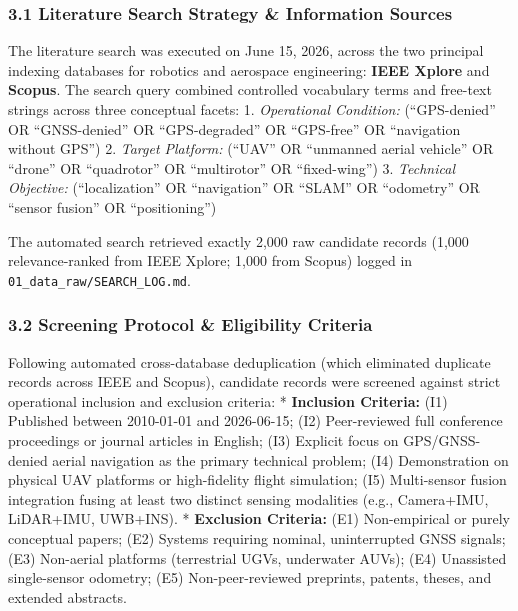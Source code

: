 \documentclass[journal]{IEEEtran}
\begin{document}
\subsubsection{3.1 Literature Search Strategy \& Information
Sources}\label{literature-search-strategy-information-sources}

The literature search was executed on June 15, 2026, across the two
principal indexing databases for robotics and aerospace engineering:
\textbf{IEEE Xplore} and \textbf{Scopus}. The search query combined
controlled vocabulary terms and free-text strings across three
conceptual facets: 1. \emph{Operational Condition:} (``GPS-denied'' OR
``GNSS-denied'' OR ``GPS-degraded'' OR ``GPS-free'' OR ``navigation
without GPS'') 2. \emph{Target Platform:} (``UAV'' OR ``unmanned aerial
vehicle'' OR ``drone'' OR ``quadrotor'' OR ``multirotor'' OR
``fixed-wing'') 3. \emph{Technical Objective:} (``localization'' OR
``navigation'' OR ``SLAM'' OR ``odometry'' OR ``sensor fusion'' OR
``positioning'')

The automated search retrieved exactly 2,000 raw candidate records
(1,000 relevance-ranked from IEEE Xplore; 1,000 from Scopus) logged in
\texttt{01\_data\_raw/SEARCH\_LOG.md}.

\subsubsection{3.2 Screening Protocol \& Eligibility
Criteria}\label{screening-protocol-eligibility-criteria}

Following automated cross-database deduplication (which eliminated
duplicate records across IEEE and Scopus), candidate records were
screened against strict operational inclusion and exclusion criteria: *
\textbf{Inclusion Criteria:} (I1) Published between 2010-01-01 and
2026-06-15; (I2) Peer-reviewed full conference proceedings or journal
articles in English; (I3) Explicit focus on GPS/GNSS-denied aerial
navigation as the primary technical problem; (I4) Demonstration on
physical UAV platforms or high-fidelity flight simulation; (I5)
Multi-sensor fusion integration fusing at least two distinct sensing
modalities (e.g., Camera+IMU, LiDAR+IMU, UWB+INS). * \textbf{Exclusion
Criteria:} (E1) Non-empirical or purely conceptual papers; (E2) Systems
requiring nominal, uninterrupted GNSS signals; (E3) Non-aerial platforms
(terrestrial UGVs, underwater AUVs); (E4) Unassisted single-sensor
odometry; (E5) Non-peer-reviewed preprints, patents, theses, and
extended abstracts.
\end{document}
